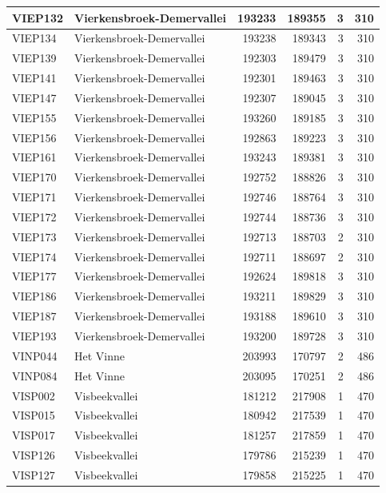 \documentclass[11pt,]{book}
\begin{document}
\begin{table}
\begin{tabular}[t]{l|l|r|r|r|r}
\hline
VIEP132 & Vierkensbroek-Demervallei & 193233 & 189355 & 3 & 310\\
\hline
VIEP134 & Vierkensbroek-Demervallei & 193238 & 189343 & 3 & 310\\
\hline
VIEP139 & Vierkensbroek-Demervallei & 192303 & 189479 & 3 & 310\\
\hline
VIEP141 & Vierkensbroek-Demervallei & 192301 & 189463 & 3 & 310\\
\hline
VIEP147 & Vierkensbroek-Demervallei & 192307 & 189045 & 3 & 310\\
\hline
VIEP155 & Vierkensbroek-Demervallei & 193260 & 189185 & 3 & 310\\
\hline
VIEP156 & Vierkensbroek-Demervallei & 192863 & 189223 & 3 & 310\\
\hline
VIEP161 & Vierkensbroek-Demervallei & 193243 & 189381 & 3 & 310\\
\hline
VIEP170 & Vierkensbroek-Demervallei & 192752 & 188826 & 3 & 310\\
\hline
VIEP171 & Vierkensbroek-Demervallei & 192746 & 188764 & 3 & 310\\
\hline
VIEP172 & Vierkensbroek-Demervallei & 192744 & 188736 & 3 & 310\\
\hline
VIEP173 & Vierkensbroek-Demervallei & 192713 & 188703 & 2 & 310\\
\hline
VIEP174 & Vierkensbroek-Demervallei & 192711 & 188697 & 2 & 310\\
\hline
VIEP177 & Vierkensbroek-Demervallei & 192624 & 189818 & 3 & 310\\
\hline
VIEP186 & Vierkensbroek-Demervallei & 193211 & 189829 & 3 & 310\\
\hline
VIEP187 & Vierkensbroek-Demervallei & 193188 & 189610 & 3 & 310\\
\hline
VIEP193 & Vierkensbroek-Demervallei & 193200 & 189728 & 3 & 310\\
\hline
VINP044 & Het Vinne & 203993 & 170797 & 2 & 486\\
\hline
VINP084 & Het Vinne & 203095 & 170251 & 2 & 486\\
\hline
VISP002 & Visbeekvallei & 181212 & 217908 & 1 & 470\\
\hline
VISP015 & Visbeekvallei & 180942 & 217539 & 1 & 470\\
\hline
VISP017 & Visbeekvallei & 181257 & 217859 & 1 & 470\\
\hline
VISP126 & Visbeekvallei & 179786 & 215239 & 1 & 470\\
\hline
VISP127 & Visbeekvallei & 179858 & 215225 & 1 & 470\\

\end{tabular}
\end{table}
\end{document}
